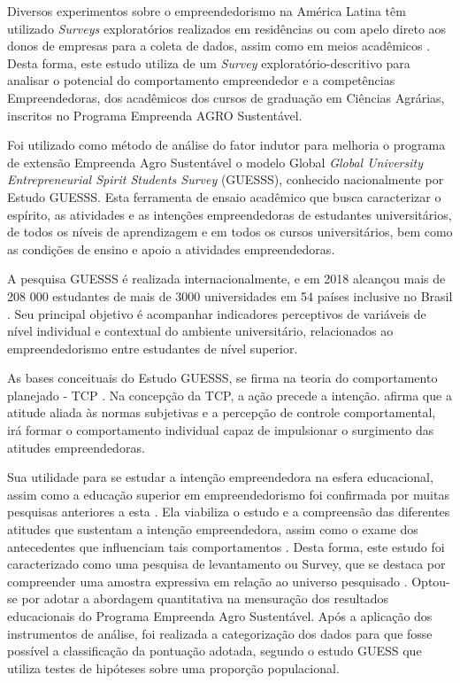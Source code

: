 Diversos experimentos sobre o empreendedorismo na América Latina têm utilizado \textit{Surveys} exploratórios realizados em residências ou com apelo direto aos donos de empresas para a coleta de dados, assim como em meios acadêmicos \cite{lima_ser_2015}. Desta forma, este estudo utiliza de um \textit{Survey} exploratório-descritivo para analisar o potencial do comportamento empreendedor e a competências Empreendedoras, dos acadêmicos dos cursos de graduação em Ciências Agrárias, inscritos no Programa Empreenda AGRO Sustentável. 

Foi utilizado como método de análise do fator indutor para melhoria o programa de extensão Empreenda Agro Sustentável o modelo Global \textit{Global University Entrepreneurial Spirit Students Survey} (GUESSS), conhecido nacionalmente por Estudo GUESSS. Esta ferramenta de ensaio acadêmico que busca caracterizar o espírito, as atividades e as intenções empreendedoras de estudantes universitários, de todos os níveis de aprendizagem e em todos os cursos universitários, bem como as condições de ensino e apoio a atividades empreendedoras.


A pesquisa GUESSS é realizada internacionalmente, e em 2018 alcançou mais de 208 000 estudantes de mais de 3000 universidades em 54 países inclusive no Brasil \cite{sieger_global_2018}. Seu principal objetivo é acompanhar indicadores perceptivos de variáveis de nível individual e contextual do ambiente universitário, relacionados ao empreendedorismo entre estudantes de nível superior.

As bases conceituais do Estudo GUESSS, se firma na teoria do comportamento planejado - TCP \cite{ajzen_perceived_2002}. Na concepção da TCP, a ação precede a intenção.  afirma que a atitude aliada às normas subjetivas e a percepção de controle comportamental, irá formar o comportamento individual capaz de impulsionar o surgimento das atitudes empreendedoras.

Sua utilidade para se estudar a intenção empreendedora na esfera educacional, assim como a educação superior em empreendedorismo foi confirmada por muitas pesquisas anteriores a esta \cite{krueger_potencial_2018,gonzalez_predictors_2009,fayolle_effect_2006}. Ela viabiliza o estudo e a compreensão das diferentes atitudes que sustentam a intenção empreendedora, assim como o exame dos antecedentes que influenciam tais comportamentos \cite{lima_educacao_2014}. Desta forma, este estudo foi caracterizado como uma pesquisa de levantamento ou Survey, que se destaca por compreender uma amostra expressiva em relação ao universo pesquisado \cite{freitas_o_2000}. Optou-se por adotar a abordagem quantitativa na mensuração dos resultados educacionais do Programa Empreenda Agro Sustentável. Após a aplicação dos instrumentos de análise, foi realizada a categorização dos dados para que fosse possível a classificação da pontuação adotada, segundo o estudo GUESS \cite{meoli_how_2019} que utiliza testes de hipóteses sobre uma proporção populacional. 


